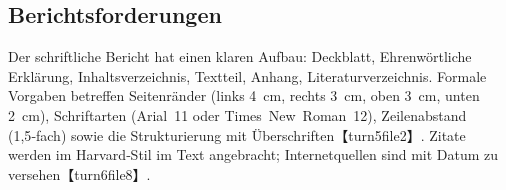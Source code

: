 \subsection{Berichtsforderungen}

Der schriftliche Bericht hat einen klaren Aufbau: Deckblatt, Ehrenwörtliche Erklärung, Inhaltsverzeichnis, Textteil, Anhang, Literaturverzeichnis. Formale Vorgaben betreffen Seitenränder (links 4~cm, rechts 3~cm, oben 3~cm, unten 2~cm), Schriftarten (Arial 11 oder Times~New~Roman 12), Zeilenabstand (1,5‑fach) sowie die Strukturierung mit Überschriften【turn5file2】. Zitate werden im Harvard‑Stil im Text angebracht; Internetquellen sind mit Datum zu versehen【turn6file8】.